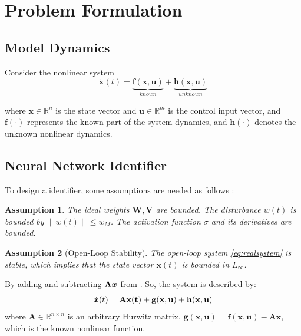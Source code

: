 \documentclass[10pt,twocolumn]{ICCAS}
\newcommand{\R}{\mathbb{R}}
\newtheorem{assumption}{Assumption}
\begin{document}
\section{Problem Formulation}
\subsection{Model Dynamics}

Consider the nonlinear system
\begin{equation}
    \dot{\bm{x}}(t) = \underbrace{\bm{f}(\bm{x}, \bm{u})}_{known} + \underbrace{\bm{h}(\bm{x}, \bm{u})}_{unknown}
    \label{eq:realsystem}
\end{equation}

where $\bm{x} \in \mathbb{R}^n$ is the state vector and $\bm{u} \in \mathbb{R}^m$ is the control input vector, and $\bm{f}(\cdot)$ represents the known part of the system dynamics, and $\bm{h}(\cdot)$ denotes the unknown nonlinear dynamics.
\subsection{Neural Network Identifier}
To design a identifier, some assumptions are needed as follows : 
\begin{assumption}
The ideal weights $\mathbf{W}, \mathbf{V}$ are bounded. The disturbance $w(t)$ is bounded by $\|w(t)\| \le w_M$. The activation function $\sigma$ and its derivatives are bounded.\\
\end{assumption}

\begin{assumption}[Open-Loop Stability]
The open-loop system \eqref{eq:realsystem} is stable, which implies that the state vector $\bm{x}(t)$ is bounded in $L_\infty$.\\ 
\end{assumption}
By adding and subtracting ${\bf{A}}\bm{x}$ from . So, the system is described by:
\begin{equation}
    \dot{\bm{x}}(t) = \bf{A}\bm{x}(t) + \bm{g}(\bm{x}, \bm{u}) + \bm{h}(\bm{x}, \bm{u})
    \label{eq:system}
\end{equation}
where $\mathbf{A} \in \R^{n \times n}$ is an arbitrary Hurwitz matrix, $\bm{g}(\bm{x},\bm{u}) = \bm{f}(\bm{x}, \bm{u}) - {\mathbf{A}} \bm{x} $, which is the known nonlinear function.
\end{document}
